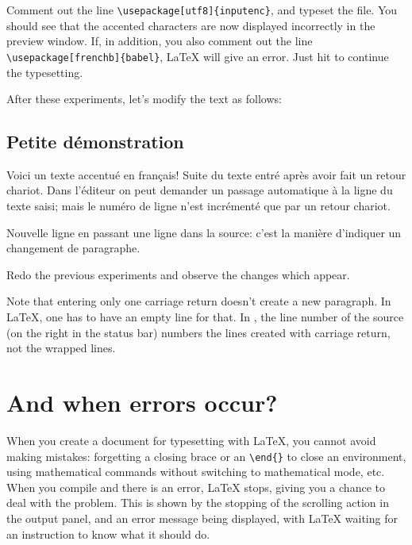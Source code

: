 Comment out the line \verb|\usepackage[utf8]{inputenc}|, and typeset the file. You should see that the accented characters are now displayed incorrectly in the preview window. If, in addition, you also comment out the line \verb|\usepackage[frenchb]{babel}|, {\LaTeX} will give an error. Just hit \Return to continue the typesetting.


After these experiments, let's modify the text as follows:
\begin{example}

\maketitle
\tableofcontents

\section{Petite démonstration}

Voici un texte accentué en français!
Suite du texte entré après avoir fait un retour chariot. Dans
l'éditeur on peut demander un passage automatique à la ligne
du texte saisi; mais le numéro de ligne n'est incrémenté que par un
retour chariot.

Nouvelle ligne en passant une ligne dans la source: c'est la
manière d'indiquer un changement de paragraphe.


\end{example}
Redo the previous experiments and observe the changes which appear.

Note that entering only one carriage return doesn't create a new paragraph. In {\LaTeX}, one has to have an empty line for that. In {\Tw}, the line number of the source (on the right in the status bar) numbers the lines created with carriage return, not the wrapped lines.

\section{And when errors occur?}

When you create a document for typesetting with {\LaTeX}, you cannot avoid making mistakes: forgetting a closing brace or an \verb|\end{}| to close an environment, using mathematical commands without switching to mathematical mode, etc. When you compile and there is an error, {\LaTeX} stops, giving you a chance to deal with the problem. This is shown by the stopping of the scrolling action in the output panel, and an error message being displayed, with {\LaTeX} waiting for an instruction to know what it should do.

